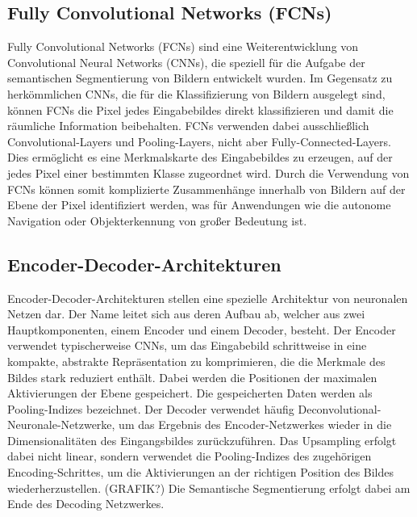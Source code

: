\subsection{Fully Convolutional Networks (FCNs)}
Fully Convolutional Networks (FCNs) sind eine Weiterentwicklung von
Convolutional Neural Networks (CNNs), die speziell für die Aufgabe der
semantischen Segmentierung von Bildern entwickelt wurden. Im Gegensatz zu
herkömmlichen CNNs, die für die Klassifizierung von Bildern ausgelegt sind,
können FCNs die Pixel jedes Eingabebildes direkt klassifizieren und damit die
räumliche Information beibehalten. FCNs verwenden dabei ausschließlich
Convolutional-Layers und Pooling-Layers, nicht aber Fully-Connected-Layers.
Dies ermöglicht es eine Merkmalskarte des Eingabebildes zu erzeugen, auf der
jedes Pixel einer bestimmten Klasse zugeordnet wird. Durch die Verwendung von
FCNs können somit komplizierte Zusammenhänge innerhalb von Bildern auf der
Ebene der Pixel identifiziert werden, was für Anwendungen wie die autonome
Navigation oder Objekterkennung von großer Bedeutung ist. \cite{7803544}

\subsection{Encoder-Decoder-Architekturen}
Encoder-Decoder-Architekturen stellen eine spezielle Architektur von neuronalen
Netzen dar. Der Name leitet sich aus deren Aufbau ab, welcher aus zwei
Hauptkomponenten, einem Encoder und einem Decoder, besteht. Der Encoder
verwendet typischerweise CNNs, um das Eingabebild schrittweise in eine
kompakte, abstrakte Repräsentation zu komprimieren, die die Merkmale des Bildes
stark reduziert enthält. Dabei werden die Positionen der maximalen
Aktivierungen der Ebene gespeichert. Die gespeicherten Daten werden als
Pooling-Indizes bezeichnet. Der Decoder verwendet häufig
Deconvolutional-Neuronale-Netzwerke, um das Ergebnis des Encoder-Netzwerkes
wieder in die Dimensionalitäten des Eingangsbildes zurückzuführen. Das
Upsampling erfolgt dabei nicht linear, sondern verwendet die Pooling-Indizes des zugehörigen Encoding-Schrittes,
um die Aktivierungen an der richtigen Position des Bildes wiederherzustellen.
(GRAFIK?) Die Semantische Segmentierung erfolgt dabei am Ende des Decoding Netzwerkes. \cite{7803544}

